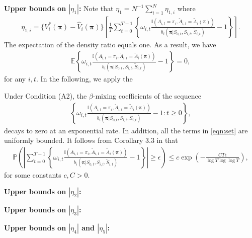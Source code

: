 \documentclass{article}
\newcommand{\Mean}{{\mathbb{E}}}
\newcommand{\prob}{{\mathbb{P}}}
\begin{document}
\textbf{Upper bounds on $|\eta_1|$: }Note that $\eta_1=N^{-1}\sum_{i=1}^N \eta_{1,i}$ where
\begin{eqnarray*}
	\eta_{1,i}=\{V_i^*(\bm{\pi})- \widehat{V}_i(\bm{\pi}) \}\left[\frac{1}{T}\sum_{t=0}^{T-1} \left\{\omega_{i,t}\frac{\mathbb{I}(A_{i,t}=\pi_i,\widetilde{A}_{i,t}=\widetilde{A}_i(\bm{\pi}))}{b_i(\bm{\pi}|S_{0,t},S_{i,t},\widetilde{S}_{i,t})}-1\right\}\right].
\end{eqnarray*}
The expectation of the density ratio equals one. As a result, we have
\begin{eqnarray*}
	\Mean \left\{\omega_{i,t}\frac{\mathbb{I}(A_{i,t}=\pi_i,\widetilde{A}_{i,t}=\widetilde{A}_i(\bm{\pi}))}{b_i(\bm{\pi}|S_{0,t},S_{i,t},\widetilde{S}_{i,t})}-1\right\}=0,
\end{eqnarray*}
for any $i,t$. In the following, we apply the 

Under Condition (A2), the $\beta$-mixing coefficients of the sequence
\begin{eqnarray}\label{eqn:set}
	\left\{\omega_{i,t}\frac{\mathbb{I}(A_{i,t}=\pi_i,\widetilde{A}_{i,t}=\widetilde{A}_i(\bm{\pi}))}{b_i(\bm{\pi}|S_{0,t},S_{i,t},\widetilde{S}_{i,t})}-1:t\ge 0\right\},
\end{eqnarray}
decays to zero at an exponential rate. In addition, all the terms in \eqref{eqn:set} are uniformly bounded. It follows from Corollary 3.3 in \cite{krebs2018} that
\begin{eqnarray*}
	\prob\left(\left|\sum_{t=0}^{T-1}  \left\{\omega_{i,t}\frac{\mathbb{I}(A_{i,t}=\pi_i,\widetilde{A}_{i,t}=\widetilde{A}_i(\bm{\pi}))}{b_i(\bm{\pi}|S_{0,t},S_{i,t},\widetilde{S}_{i,t})}-1\right\}\right|\ge \epsilon \right)\le c\exp\left(-\frac{CT\epsilon}{\log T \log \log T}\right),
\end{eqnarray*}
for some constants $c,C>0$. 


\textbf{Upper bounds on $|\eta_2|$: }

\textbf{Upper bounds on $|\eta_3|$: }

\textbf{Upper bounds on $|\eta_4|$ and $|\eta_5|$: }




	
\end{document}
